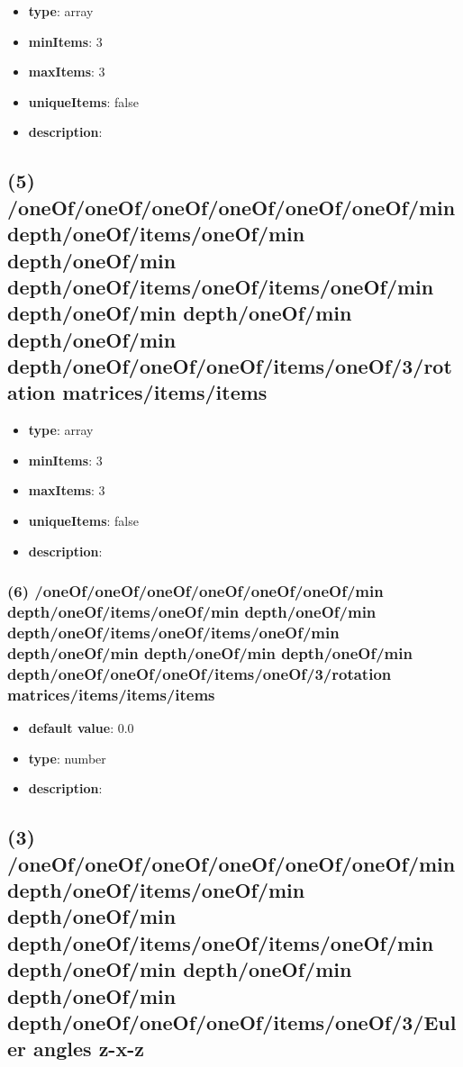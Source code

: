 \begin{itemize}[leftmargin=4em]\item {\bf type}: array
\item {\bf minItems}: 3
\item {\bf maxItems}: 3
\item {\bf uniqueItems}: false
\item {\bf description}: 
\end{itemize}\subsection{(5) /oneOf/oneOf/oneOf/oneOf/oneOf/oneOf/min depth/oneOf/items/oneOf/min depth/oneOf/min depth/oneOf/items/oneOf/items/oneOf/min depth/oneOf/min depth/oneOf/min depth/oneOf/min depth/oneOf/oneOf/oneOf/items/oneOf/3/rotation matrices/items/items}
\begin{itemize}[leftmargin=5em]\item {\bf type}: array
\item {\bf minItems}: 3
\item {\bf maxItems}: 3
\item {\bf uniqueItems}: false
\item {\bf description}: 
\end{itemize}\subsubsection{(6) /oneOf/oneOf/oneOf/oneOf/oneOf/oneOf/min depth/oneOf/items/oneOf/min depth/oneOf/min depth/oneOf/items/oneOf/items/oneOf/min depth/oneOf/min depth/oneOf/min depth/oneOf/min depth/oneOf/oneOf/oneOf/items/oneOf/3/rotation matrices/items/items/items}
\begin{itemize}[leftmargin=6em]\item {\bf default value}: 0.0
\item {\bf type}: number
\item {\bf description}: 
\end{itemize}\subsection{(3) /oneOf/oneOf/oneOf/oneOf/oneOf/oneOf/min depth/oneOf/items/oneOf/min depth/oneOf/min depth/oneOf/items/oneOf/items/oneOf/min depth/oneOf/min depth/oneOf/min depth/oneOf/min depth/oneOf/oneOf/oneOf/items/oneOf/3/Euler angles z-x-z}
